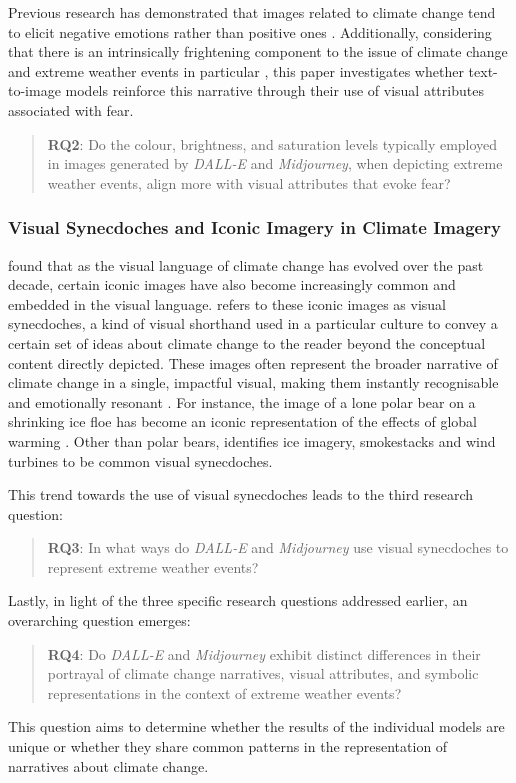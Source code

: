 Previous research has demonstrated that images related to climate change tend to elicit negative emotions rather than positive ones \parencite{ONeill2017}. Additionally, considering that there is an intrinsically frightening component to the issue of climate change and extreme weather events in particular \parencite{Soutar2022}, this paper investigates whether text-to-image models reinforce this narrative through their use of visual attributes associated with fear.
\begin{quote}
\textbf{RQ2}: Do the colour, brightness, and saturation levels typically employed in images generated by \textit{DALL-E} and \textit{Midjourney}, when depicting extreme weather events, align more with visual attributes that evoke fear? 
\end{quote}
\subsubsection{Visual Synecdoches and Iconic Imagery in Climate Imagery}

\textcite[16]{ONeill2019} found that as the visual language of climate change has evolved over the past decade, certain iconic images have also become increasingly common and embedded in the visual language. \textcite[17]{ONeill2019} refers to these iconic images as visual synecdoches, a kind of visual shorthand used in a particular culture to convey a certain set of ideas about climate change  to the reader beyond the conceptual content directly depicted. These images often represent the broader narrative of climate change in a single, impactful visual, making them instantly recognisable and emotionally resonant \parencite[78]{ONeill2014}. For instance, the image of a lone polar bear on a shrinking ice floe has become an iconic representation of the effects of global warming \parencite[18]{ONeill2019}. Other than polar bears, \textcite[16]{ONeill2019} identifies ice imagery, smokestacks and wind turbines to be common visual synecdoches.

This trend towards the use of visual synecdoches leads to the third research question:
 \begin{quote}
\textbf{RQ3}: In what ways do \textit{DALL-E} and \textit{Midjourney} use visual synecdoches to represent extreme weather events?

 \end{quote}

Lastly, in light of the three specific research questions addressed earlier, an overarching question emerges:

\begin{quote}
\textbf{RQ4}: Do \textit{DALL-E} and \textit{Midjourney} exhibit distinct differences in their portrayal of climate change narratives, visual attributes, and symbolic representations in the context of extreme weather events?
\end{quote}

This question aims to determine whether the results of the individual models are unique or whether they share common patterns in the representation of narratives about climate change.





